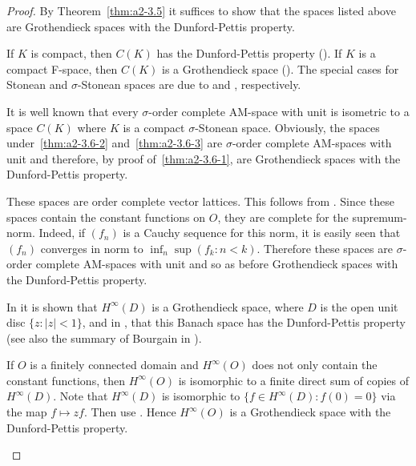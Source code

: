 \begin{proof}
By Theorem~\ref{thm:a2-3.5}   it suffices to show that the spaces listed above are Grothendieck spaces with the Dunford-Pettis property.
\begin{description}[style=standard, wide, labelindent=.25em]
		
\item[\ref{thm:a2-3.6-1}] 
	If\/ $K$ is compact, then $C(K)$ has the Dunford-Pettis property (\cf \textcite[Théorème 4]{grothendieck:1953}).
	If\/ $K$ is a compact F-space, then $C(K)$ is a Grothendieck space (\cf \textcite[Theorem 2.5]{seever:1968}). 
	The special cases for Stonean and $\sigma$-Stonean spaces are due to \textcite[Théorème 9]{grothendieck:1953} and \textcite{ando:1961},  respectively.
		
\item[\ref{thm:a2-3.6-2} and~\ref{thm:a2-3.6-3}] It is well known that every $\sigma$-order complete AM-space with unit is isometric to a space $C(K)$ where $K$ is a compact $\sigma$-Stonean space.
Obviously, the spaces under~\ref{thm:a2-3.6-2}   and~\ref{thm:a2-3.6-3}  are $\sigma$-order complete AM-spaces with unit and therefore, by proof of~\ref{thm:a2-3.6-1}, are  Grothendieck spaces with the Dunford-Pettis property.
		
\item[\ref{thm:a2-3.6-4} and~\ref{thm:a2-3.6-5}] These spaces are order complete vector lattices.
This follows from \textcite[pp.18-22, Standardbeispiele 1 and 2 p.55]{bauer:1966}.
Since these spaces contain the constant functions on $O$, they are complete for the supremum-norm.
Indeed, if\/ $(f_n)$ is a Cauchy sequence for this norm, it is easily seen that $(f_n)$ converges in norm to $\inf_n \sup(f_k \colon n < k)$.
Therefore these spaces are $\sigma$-order complete AM-spaces with unit and so as before Grothendieck spaces with the Dunford-Pettis property.
		
\item[\ref{thm:a2-3.6-6}] In \textcite{bourgain:1982} it is shown that $H^{\infty}(D)$ is a Grothendieck space, where $D$ is the open unit disc $\{z \colon |z| < 1\}$, and in \textcite{bourgain:1984}, that this Banach space has the Dunford-Pettis property (see also the summary of Bourgain in \textcite{blei:1983}).
		
If\/ $O$ is a finitely connected domain and $H^{\infty}(O)$ does not only contain the constant functions, then $H^{\infty}(O)$ is isomorphic to a finite direct sum of copies of\/ $H^{\infty}(D)$.
Note that $H^{\infty}(D)$ is isomorphic to $\{f \in H^{\infty}(D) \colon f(0) = 0\}$ via the map $f \mapsto zf$.
Then use \textcite[p.77 and Proposition 4.4.1]{grothendieck:1953}.
Hence $H^{\infty}(O)$ is a Grothendieck space with the Dunford-Pettis property.
\qedhere
\end{description}
\end{proof}
